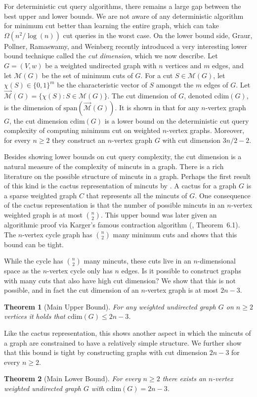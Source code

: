 \documentclass[10pt,a4paper]{article}
\newcommand{\M}{\mathcal{M}}
\newcommand{\laspan}{\mathrm{span}}
\newcommand{\cd}{\mathrm{cdim}}
\newcommand{\1}{\mathbf{1}}
\newtheorem{theorem}{Theorem}
\theoremstyle{definition}
\begin{document}
For deterministic cut query algorithms, there remains a large gap between the best upper and lower bounds.  We are not aware of any deterministic algorithm for minimum cut
better than learning the entire graph, which can take $\Omega(n^2/\log(n))$ cut queries in the worst case.  On the lower bound side, Graur, Pollner, Ramaswamy, and Weinberg \cite{GPRW20} recently introduced
a very interesting lower bound technique called the \emph{cut dimension}, which we now describe.  Let $G = (V,w)$ be a weighted undirected graph with $n$ vertices and $m$ edges, and let $\M(G)$ be
the set of minimum cuts of $G$.  For a cut $S \in \M(G)$,
let $\chi(S) \in \{0,1\}^{m}$ be the characteristic vector of $S$
amongst the $m$ edges of $G$.  Let $\vec{\M}(G) = \{\chi(S): S \in \M(G) \}$.  The cut dimension of $G$, denoted
$\cd(G)$, is the dimension of $\laspan(\vec{\M}(G))$.
It is shown in \cite{GPRW20} that for any $n$-vertex graph $G$, the cut dimension $\cd(G)$ is a lower bound on the deterministic cut query complexity of computing
minimum cut on weighted $n$-vertex graphs.  Moreover, for every $n \ge 2$ they construct an $n$-vertex graph $G$ with cut dimension $3n/2-2$.

Besides showing lower bounds on cut query complexity, the cut dimension is a natural measure of the complexity of mincuts in a graph.  There is a rich
literature on the possible structure of mincuts in a graph.  Perhaps the first result of this kind is the cactus representation of mincuts by \cite{DKL76}.
A cactus for a graph $G$ is a sparse weighted graph $C$ that represents all the mincuts of $G$.  One consequence of the
cactus representation is that the number of possible mincuts in an $n$-vertex weighted graph is at most $\binom{n}{2}$.  This upper bound was later given
an algorithmic proof via Karger's famous contraction algorithm (\cite{Karger93}, Theorem~6.1).  The
$n$-vertex cycle graph has $\binom{n}{2}$ many minimum cuts and shows that this bound can be tight.

While the cycle has $\binom{n}{2}$ many mincuts, these cuts live in an $n$-dimensional space as the $n$-vertex cycle only has $n$ edges.  Is it possible to construct graphs
with many cuts that also have high cut dimension?  We show that this is not possible, and in fact the cut dimension of an $n$-vertex graph is at most $2n-3$.
\begin{theorem}[Main Upper Bound]
\label{thm:cd_upper}
For any weighted undirected graph $G$ on $n\ge 2$ vertices it holds that $\cd(G) \le 2n-3$.
\end{theorem}
Like the cactus representation, this shows another aspect in which the mincuts of a graph are constrained to have a relatively simple structure.  We further show that this bound is
tight by constructing graphs with cut dimension $2n-3$ for every $n \ge 2$.
\begin{theorem}[Main Lower Bound]
\label{thm:cd_lower}
For every $n \ge 2$ there exists an $n$-vertex weighted undirected graph $G$ with $\cd(G) = 2n-3$.
\end{theorem}
\end{document}
